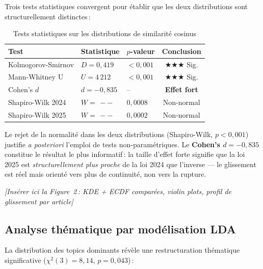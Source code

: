 \documentclass[12pt, a4paper]{article}
\newcommand{\sig}[1]{\textcolor{rougeCMR}{\textbf{#1}}}
\newcommand{\figref}[1]{\textcolor{bleuCMR}{\textit{[#1]}}}
\begin{document}
Trois tests statistiques convergent pour établir que les deux distributions sont structurellement distinctes\,:

\begin{table}[H]
\centering
\caption{Tests statistiques sur les distributions de similarité cosinus}
\label{tab:tests_sim}
\small
\begin{tabularx}{\linewidth}{lXXc}
\toprule
\rowcolor{bleuCMR!15}
\textbf{Test} & \textbf{Statistique} & \textbf{$p$-valeur} & \textbf{Conclusion} \\
\midrule
Kolmogorov-Smirnov & $D = 0{,}419$ & $<0{,}001$ & \sig{$\bigstar\bigstar\bigstar$} Sig. \\
Mann-Whitney U & $U = 4\,212$ & $<0{,}001$ & \sig{$\bigstar\bigstar\bigstar$} Sig. \\
Cohen's $d$ & $d = -0{,}835$ & -- & \sig{Effet fort} \\
Shapiro-Wilk 2024 & $W =\,--$ & $0{,}0008$ & Non-normal \\
Shapiro-Wilk 2025 & $W =\,--$ & $0{,}0002$ & Non-normal \\
\bottomrule
\end{tabularx}
\end{table}

Le rejet de la normalité dans les deux distributions (Shapiro-Wilk, $p<0{,}001$) justifie 
\textit{a posteriori} l'emploi de tests non-paramétriques. Le \textbf{Cohen's $d = -0{,}835$} 
constitue le résultat le plus informatif\,: la taille d'effet forte signifie que la loi 2025 
est \textit{structurellement plus proche} de la loi 2024 que l'inverse — le glissement est réel 
mais orienté vers plus de continuité, non vers la rupture.

\figref{Insérer ici la Figure~2\,: KDE + ECDF comparées, violin plots, profil de glissement par article}

\subsection{Analyse thématique par modélisation LDA}

La distribution des topics dominants révèle une restructuration thématique significative 
($\chi^2(3) = 8{,}14$, $p = 0{,}043$)\,:
\end{document}
